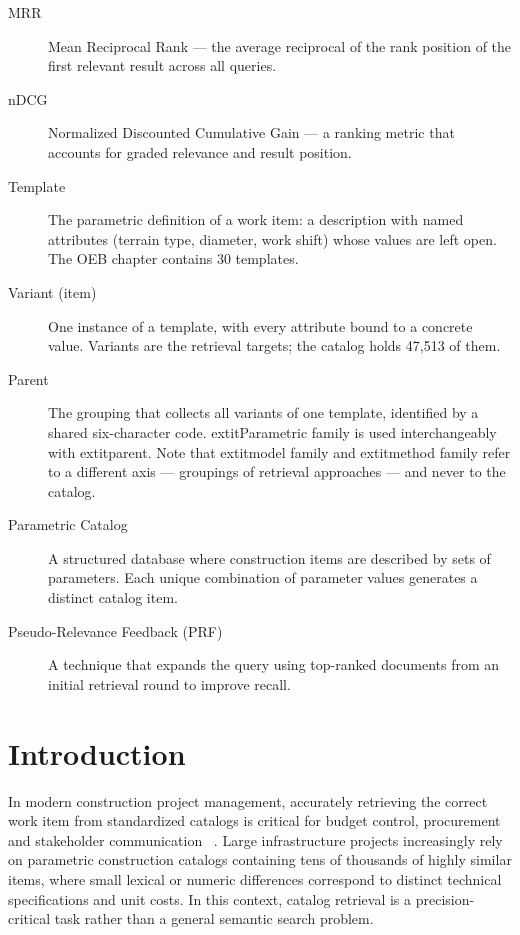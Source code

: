 \documentclass[preprint,12pt]{elsarticle}
\begin{document}
\begin{description}
    \item[MRR] Mean Reciprocal Rank — the average reciprocal of the rank position of the first relevant result across all queries.
    
    \item[nDCG] Normalized Discounted Cumulative Gain --- a ranking metric that accounts for graded relevance and result position.

    \item[Template] The parametric definition of a work item: a description with named
    attributes (terrain type, diameter, work shift) whose values are left open. The OEB
    chapter contains 30 templates.

    \item[Variant (item)] One instance of a template, with every attribute bound to a
    concrete value. Variants are the retrieval targets; the catalog holds 47,513 of them.

    \item[Parent] The grouping that collects all variants of one template, identified by a
    shared six-character code. 	extit{Parametric family} is used interchangeably with
    	extit{parent}. Note that 	extit{model family} and 	extit{method family} refer to a
    different axis --- groupings of retrieval approaches --- and never to the catalog.

    \item[Parametric Catalog] A structured database where construction items are described by sets of parameters.  Each unique combination of parameter values generates a distinct catalog item.
    
    \item[Pseudo-Relevance Feedback (PRF)] A technique that expands the query using top-ranked documents from an initial retrieval round to improve recall.

\end{description}

\section{Introduction}
\label{sec:introduction}
In modern construction project management, accurately retrieving the correct work item from standardized catalogs  is critical for budget control, procurement and stakeholder communication ~\cite{martinez-rojasApproachAutomaticClassification2015, natural_wu_2022}. Large infrastructure projects increasingly rely on parametric construction catalogs containing tens of thousands of highly similar items, where small lexical or numeric differences correspond to distinct technical specifications and unit costs. In this context, catalog retrieval is a precision-critical task rather than a general semantic search problem.
\end{document}
